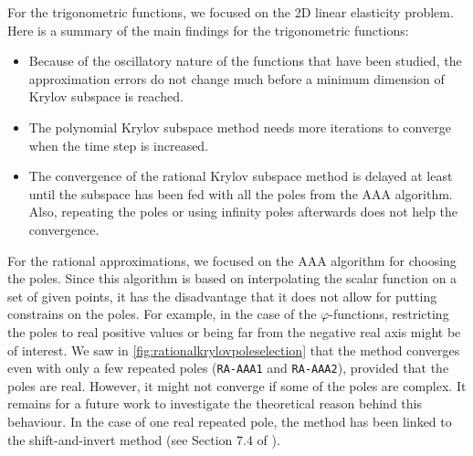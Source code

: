 For the trigonometric functions, we focused on the 2D linear elasticity problem.
Here is a summary of the main findings for the trigonometric functions:
\begin{itemize}
    \item Because of the oscillatory nature of the functions that have been studied,
        the approximation errors do not change much before a minimum dimension of
        Krylov subspace is reached.
    \item The polynomial Krylov subspace method needs more iterations to converge
        when the time step is increased.
    \item The convergence of the rational Krylov subspace method is delayed at least
        until the subspace has been fed with all the poles from the AAA algorithm.
        Also, repeating the poles or using infinity poles afterwards does not help
        the convergence.
\end{itemize}

For the rational approximations, we focused on the AAA algorithm for choosing the poles.
Since this algorithm is based on interpolating the scalar function on a set of given
points, it has the disadvantage that it does not allow for putting constrains on the poles.
For example, in the case of the $\varphi$-functions, restricting the poles to real positive
values or being far from the negative real axis might be of interest.
We saw in \autoref{fig:rationalkrylovpoleselection} that the method converges even with
only a few repeated poles (\texttt{RA-AAA1} and \texttt{RA-AAA2}), provided that the poles
are real. However, it might not converge if some of the poles are complex.
It remains for a future work to investigate the theoretical reason behind this behaviour.
In the case of one real repeated pole, the method has been linked to the shift-and-invert
method (see Section 7.4 of \cite{guttel2010rational}).
